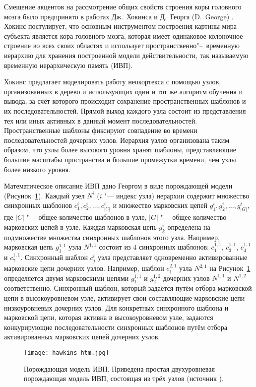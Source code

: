 Смещение акцентов на рассмотрение общих свойств строения коры головного мозга было предпринято в работах Дж.~Хокинса и Д.~Георга (D.~George) \cite{George2005,Hawkins2009}. Хокинс постулирует, что основным инструментом построения картины мира субъекта является кора головного мозга, которая имеет одинаковое колоночное строение во всех своих областях и использует пространственно"--~временную иерархию для хранения построенной модели действительности, так называемую временную иерархическую память (ИВП).

Хокинс предлагает моделировать работу неокортекса с помощью узлов, организованных в дерево и использующих один и тот же алгоритм обучения и вывода, за счёт которого происходит сохранение пространственных шаблонов и их последовательностей. Прямой выход каждого узла состоит из представления тех или иных активных в данный момент последовательностей. Пространственные шаблоны фиксируют совпадение во времени последовательностей дочерних узлов. Иерархия узлов организована таким образом, что узлы более высокого уровня хранят шаблоны, представляющие большие масштабы пространства и большие промежутки времени, чем узлы более низкого уровня.

Математическое описание ИВП дано Георгом в виде порождающей модели (Рисунок~\ref{fg:hawkins_htm}). Каждый узел $N^i$ ($i$ "--- индекс узла) иерархии содержит множество синхронных шаблонов $c_1^i, c_2^i,\dots,c_{|C|}^i$ и множество марковских цепей $g_1^i,g_2^i,\dots,g_{|G|}^i$, где $|C|$ "--- общее количество шаблонов в узле, $|G|$ "--- общее количество марковских цепей в узле. Каждая марковская цепь $g_k^i$ определена на подмножестве множества синхронных шаблонов этого узла. Например, марковская цепь $g_1^{1,1}$ узла $N^{1,1}$ состоит из $4$ синхронных шаблонов: $c_1^{1,1}$, $c_3^{1,1}$, $c_4^{1,1}$ и $c_7^{1,1}$. Синхронный шаблон $c_j^i$ узла представляет одновременно активированные марковские цепи дочерних узлов. Например, шаблон $c_1^{2,1}$ узла $N^{2,1}$ на Рисунок~\ref{fg:hawkins_htm} определяется двумя марковскими цепями $g_1^{1,1}$ и $g_2^{1,2}$ дочерних узлов $N^{1,1}$ и $N^{1,2}$ соответственно. Синхронный шаблон, который задаётся путём отбора марковской цепи в высокоуровневом узле, активирует свои составляющие марковские цепи низкоуровневых дочерних узлов. Для конкретных синхронного шаблона и марковской цепи, которая активна в высокоуровневом узле, задаются конкурирующие последовательности синхронных шаблонов путём отбора активированных марковских цепей дочерних узлов.

\begin{figure}[h]
	\centering
	\texttt{[image: hawkins\_htm.jpg]}
	\caption{Порождающая модель ИВП. Приведена простая двухуровневая порождающая модель ИВП, состоящая из трёх узлов (источник \cite{Hawkins2009}).}
	\label{fg:hawkins_htm}
\end{figure}

